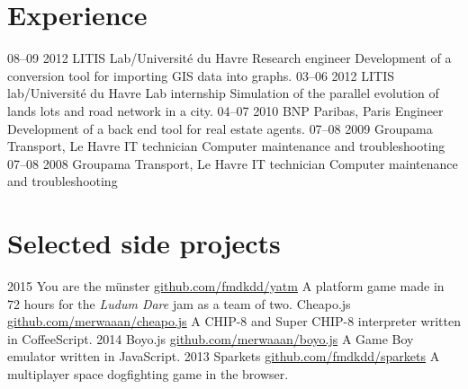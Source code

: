\documentclass[]{friggeri-cv}
\begin{document}
\section{Experience}

\begin{entrylist}
  \entry
    {08–09 2012}
    {LITIS Lab/Université du Havre}
    {Research engineer}
    {Development of a conversion tool for importing GIS data into graphs.}
  \entry
    {03–06 2012}
    {LITIS lab/Université du Havre}
    {Lab internship}
    {Simulation of the parallel evolution of lands lots and road network in a city.}
  \entry
    {04–07 2010}
    {BNP Paribas, Paris}
    {Engineer}
    {Development of a back end tool for real estate agents.}
  \entry
    {07–08 2009}
    {Groupama Transport, Le Havre}
    {IT technician}
    {Computer maintenance and troubleshooting}
  \entry
    {07–08 2008}
    {Groupama Transport, Le Havre}
    {IT technician}
    {Computer maintenance and troubleshooting}
\end{entrylist}

\section{Selected side projects}

\begin{entrylist}
  \entry
    {2015}
    {You are the münster}
    {\href{http://github.com/fmdkdd/yatm}{github.com/fmdkdd/yatm}}
    {A platform game made in 72 hours for the \textit{Ludum Dare} jam as a team of two.}
  \entry
    {}
    {Cheapo.js}
    {\href{http://github.com/merwaaan/cheapo.js}{github.com/merwaaan/cheapo.js}}
    {A CHIP-8 and Super CHIP-8 interpreter written in CoffeeScript.}
  \entry
    {2014}
    {Boyo.js}
    {\href{http://github.com/merwaaan/boyo.js}{github.com/merwaaan/boyo.js}}
    {A Game Boy emulator written in JavaScript.}
  \entry
    {2013}
    {Sparkets}
    {\href{http://github.com/fmdkdd/sparkets}{github.com/fmdkdd/sparkets}}
    {A multiplayer space dogfighting game in the browser.}
\end{entrylist}
\end{document}
